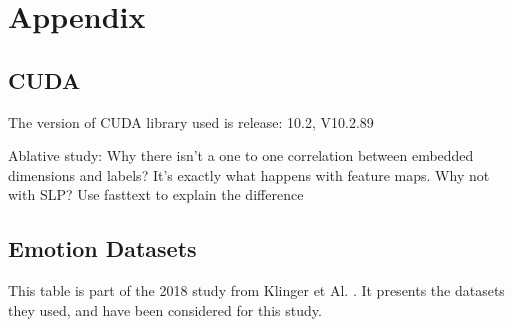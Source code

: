 \chapter{Appendix}\label{chap:Appendix}


\section{CUDA}\label{sec:CUDA}

The version of CUDA library used is release: 10.2, V10.2.89


Ablative study: Why there isn't a one to one correlation between embedded dimensions and labels?
It's exactly what happens with feature maps. Why not with SLP? Use fasttext to explain the difference


\section{Emotion Datasets}\label{sec:Emotion Datasets}
This table is part of the 2018 study from Klinger et Al. \cite{klinger2018analysis}. It presents the datasets they used, and have been considered for this study.
